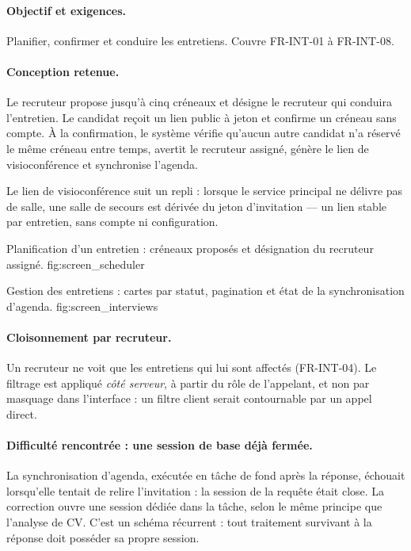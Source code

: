 \paragraph{Objectif et exigences.} Planifier, confirmer et conduire les
entretiens. Couvre FR-INT-01 à FR-INT-08.

\paragraph{Conception retenue.} Le recruteur propose jusqu'à cinq créneaux et
désigne le recruteur qui conduira l'entretien. Le candidat reçoit un lien
public à jeton et confirme un créneau sans compte. À la confirmation, le
système vérifie qu'aucun autre candidat n'a réservé le même créneau entre
temps, avertit le recruteur assigné, génère le lien de visioconférence et
synchronise l'agenda.

Le lien de visioconférence suit un repli : lorsque le service principal ne
délivre pas de salle, une salle de secours est dérivée du jeton d'invitation —
un lien stable par entretien, sans compte ni configuration.

  {Planification d'un entretien : créneaux proposés et désignation du
   recruteur assigné.}
  {fig:screen_scheduler}

  {Gestion des entretiens : cartes par statut, pagination et état de la
   synchronisation d'agenda.}
  {fig:screen_interviews}

\paragraph{Cloisonnement par recruteur.} Un recruteur ne voit que les
entretiens qui lui sont affectés (FR-INT-04). Le filtrage est appliqué
\emph{côté serveur}, à partir du rôle de l'appelant, et non par masquage dans
l'interface : un filtre client serait contournable par un appel direct.

\paragraph{Difficulté rencontrée : une session de base déjà fermée.} La
synchronisation d'agenda, exécutée en tâche de fond après la réponse, échouait
lorsqu'elle tentait de relire l'invitation : la session de la requête était
close. La correction ouvre une session dédiée dans la tâche, selon le même
principe que l'analyse de CV. C'est un schéma récurrent : tout traitement
survivant à la réponse doit posséder sa propre session.

